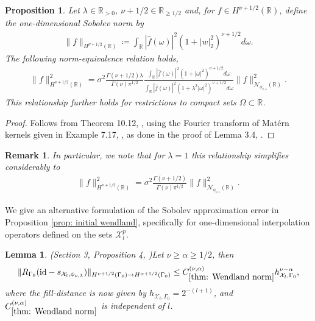 \documentclass[pdflatex,sn-mathphys-num]{sn-jnl}%
\theoremstyle{thmstyleone}%
\newtheorem{proposition}{Proposition}%
\newtheorem{lemma}{Lemma}%
\theoremstyle{thmstyletwo}%
\newtheorem{remark}{Remark}%
\theoremstyle{thmstylethree}%
\begin{document}
\begin{proposition}\label{prop: equivalence}
Let \(\lambda \in\mathbb{R}_{>0}\), \(\nu+1/2\in\mathbb{R}_{\geq1/2}\) and, for \(f\in H^{\nu+1/2}(\mathbb{R})\), define the one-dimensional Sobolev norm by
\begin{align}
    \|f\|_{H^{\nu+1/2}(\mathbb{R})}\coloneqq\int_{\mathbb{R}}|\widehat{f}(\omega)|^2(1+|w|_2^2)^{\nu+1/2}d\omega.\nonumber
\end{align}
The following norm-equivalence relation holds,
\begin{align}
    \|f\|_{H^{\nu+1/2}(\mathbb{R})}^2=\sigma^2\frac{\Gamma(\nu+1/2)\lambda}{\Gamma(\nu)\pi^{1/2}}\frac{\int_\mathbb{R}|\widehat{f}(\omega)|^2(1+|\omega|^2)^{\nu+1/2}d\omega}{\int_\mathbb{R}|\widehat{f}(\omega)|^2(1+\lambda^2|\omega|^2)^{\nu+1/2}d\omega}\|f\|_{\mathcal{N}_{\phi_{\nu,\lambda}}(\mathbb{R})}^2.\nonumber
\end{align}
This relationship further holds for restrictions to compact sets \(\Omega\subset\mathbb{R}\).
\end{proposition}
\begin{proof}
    Follows from Theorem 10.12, \cite{wendland_2004}, using the Fourier transform of Mat\'ern kernels given in Example 7.17, \cite{Lord_Powell_Shardlow_2014}, as done in the proof of Lemma 3.4, \cite{Teckentrup2020}.
\end{proof}
\begin{remark} \label{rem: change norm}
    In particular, we note that for \(\lambda=1\) this relationship simplifies considerably to 
    \begin{align}
        \|f\|_{H^{\nu+1/2}(\mathbb{R})}^2=\sigma^2\frac{\Gamma(\nu+1/2)}{\Gamma(\nu)\pi^{1/2}}\|f\|_{\mathcal{N}_{\phi_{\nu,1}}(\mathbb{R})}^2.\nonumber
    \end{align}
\end{remark}
We give an alternative formulation of the Sobolev approximation error in Proposition \ref{prop: initial wendland}, specifically for one-dimensional interpolation operators defined on the sets \(\mathcal{X}^p_l\).
\begin{lemma}(Section 3, Proposition 4, \cite{Nobile2018})\label{thm: Wendland norm}
    Let \(\nu\geq\alpha\geq1/2\), then
    \begin{equation}\label{eq: wendland constant}
        \|R_{\Gamma_0}(\textup{id}-s_{\mathcal{X}_l,\phi_{\nu,\lambda}})\|_{H^{\nu+1/2}(\Gamma_0)\rightarrow H^{\alpha+1/2}(\Gamma_0)}\leq C^{(\nu,\alpha)}_{\ref{thm: Wendland norm}}h^{\nu-\alpha}_{\mathcal{X}_{l},\Gamma_0},
    \end{equation}
    where the fill-distance is now given by
    \(h_{\mathcal{X}_{l},\Gamma_0}=2^{-(l+1)}\), 
    and \(C^{(\nu,\alpha)}_{\ref{thm: Wendland norm}}\) is independent of \({l}\).
\end{lemma}
\end{document}
